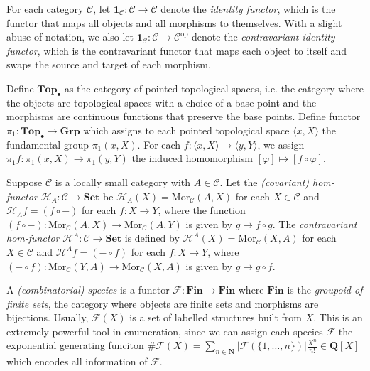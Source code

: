 \documentclass[11pt]{book}
\begin{document}
\begin{example}For each category $\mathcal C$, let $\mathbf 1_{\mathcal C}:\mathcal C\rightarrow\mathcal C$ denote the \textit{identity functor}, which is the functor that maps all objects and all morphisms to themselves. With a slight abuse of notation, we also let $\mathbf 1_{\mathcal C}:\mathcal C\rightarrow\mathcal C^{\mathrm{op}}$ denote the \textit{contravariant identity functor}, which is the contravariant functor that maps each object to itself and swaps the source and target of each morphism.
\end{example}
\begin{example}Define $\mathbf{Top}_{\bullet}$ as the category of pointed topological spaces, i.e. the category where the objects are topological spaces with a choice of a base point and the morphisms are continuous functions that preserve the base points. Define functor $\pi_1:\mathbf{Top}_{\bullet}\rightarrow\mathbf{Grp}$ which assigns to each pointed topological space $\langle x,X\rangle$ the fundamental group $\pi_1(x,X)$. For each $f:\langle x,X\rangle\rightarrow \langle y,Y\rangle$, we assign $\pi_1f:\pi_1(x,X)\rightarrow\pi_1(y,Y)$ the induced homomorphism $[\varphi]\mapsto [f\circ\varphi]$.
\end{example}
\begin{example}Suppose $\mathcal C$ is a locally small category with $A\in\mathcal C$. Let the \textit{(covariant) hom-functor} $\mathscr{H}_A:\mathcal C\rightarrow \mathbf{Set}$ be $\mathscr{H}_A(X)=\mathrm{Mor}_{\mathcal C}(A,X)$ for each $X\in\mathcal C$ and $\mathscr{H}_Af=(f\circ -)$ for each $f:X\rightarrow Y$, where the function $(f\circ -):\mathrm{Mor}_{\mathcal C}(A,X)\rightarrow \mathrm{Mor}_{\mathcal C}(A,Y)$ is given by $g\mapsto f\circ g$. The \textit{contravariant hom-functor} $\mathscr{H}^A:\mathcal C\rightarrow \mathbf{Set}$ is defined by $\mathscr{H}^A(X)=\mathrm{Mor}_{\mathcal C}(X,A)$ for each $X\in\mathcal C$ and $\mathscr{H}^Af=(-\circ f)$ for each $f:X\rightarrow Y$, where $(-\circ f):\mathrm{Mor}_{\mathcal C}(Y,A)\rightarrow \mathrm{Mor}_{\mathcal C}(X,A)$ is given by $g\mapsto g\circ f$.
\end{example}
\begin{example}A \textit{(combinatorial) species} is a functor $\mathscr{F}:\mathbf{Fin}\rightarrow \mathbf{Fin}$ where $\mathbf{Fin}$ is the \textit{groupoid of finite sets}, the category where objects are finite sets and morphisms are bijections. Usually, $\mathscr{F}(X)$ is a set of labelled structures built from $X$. This is an extremely powerful tool in enumeration, since we can assign each species $\mathscr{F}$ the exponential generating funciton 
$\#{\mathscr{F}}(X)=\sum_{n\in\mathbf N}|\mathscr{F}(\{1,\dots,n\})|\frac{X^n}{n!}\in\mathbf{Q}[X]$
which encodes all information of $\mathscr{F}$.
\end{example}
\end{document}
